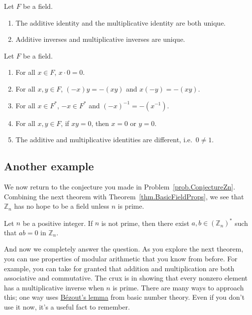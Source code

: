 \begin{fact}\label{thm.BasicFieldPropsUniqueness}
Let $F$ be a field. 
\begin{enumerate}
\item The additive identity and the multiplicative identity are both unique.
\item Additive inverses and multiplicative inverses are unique.
\end{enumerate}
\end{fact}

\begin{theorem}\label{thm.BasicFieldProps}
Let $F$ be a field. 
\begin{enumerate}
\item For all $x\in F$, $x\cdot0 = 0$.
\item For all $x,y\in F$, $(-x)y = -(xy)$ and $x(-y) = -(xy)$.
\item For all $x\in F^*$, $-x\in F^*$ and $(-x)^{-1} = -(x^{-1})$.
\item\label{thm.BasicFieldProps.NoZeroDivisors} For all $x,y\in F$, if $xy = 0$, then $x=0$ or $y=0$.
\item The additive and multiplicative identities are different, i.e.~$0\neq 1$.
\end{enumerate}
\end{theorem}

\subsection{Another example}
We now return to the conjecture you made in Problem~\ref{prob.ConjectureZn}. Combining the next theorem with Theorem~\ref{thm.BasicFieldProps}, we see that $\mathbb{Z}_n$ has no hope to be a field unless $n$ is prime.

\begin{theorem}
Let $n$ be a positive integer. If $n$ is not prime, then there exist $a,b\in (\mathbb{Z}_n)^*$ such that $ab=0$ in $\mathbb{Z}_n$.
\end{theorem}

And now we completely answer the question. As you explore the next theorem, you can use properties of modular arithmetic that you know from before. For example, you can take for granted that addition and multiplication are both associative and commutative. The crux is in showing that every nonzero element has a multiplicative inverse when $n$ is prime. There are many ways to approach this; one way uses \href{https://en.wikipedia.org/wiki/Bezout\%27s_identity}{B\'ezout's lemma} from basic number theory. Even if you don't use it now, it's a  useful fact to remember.

